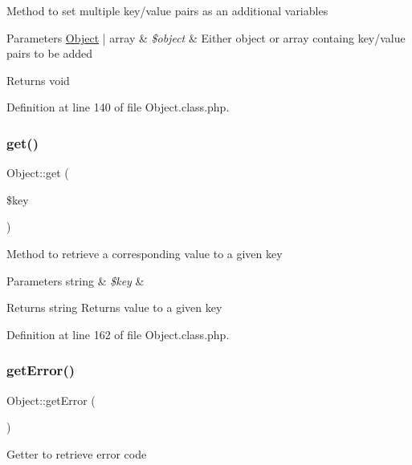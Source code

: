 Method to set multiple key/value pairs as an additional variables


\begin{DoxyParams}[1]{Parameters}
\hyperlink{classObject}{Object} | array & {\em \$object} & Either object or array containg key/value pairs to be added \\
\hline
\end{DoxyParams}
\begin{DoxyReturn}{Returns}
void 
\end{DoxyReturn}


Definition at line 140 of file Object.\+class.\+php.

\mbox{\label{classObject_ae6dff49b7ab68822bdb4ce6940c10d3f}} 
\subsubsection{\texorpdfstring{get()}{get()}}
{\footnotesize\ttfamily Object\+::get (\begin{DoxyParamCaption}\item[{}]{\$key }\end{DoxyParamCaption})}

Method to retrieve a corresponding value to a given key


\begin{DoxyParams}[1]{Parameters}
string & {\em \$key} & \\
\hline
\end{DoxyParams}
\begin{DoxyReturn}{Returns}
string Returns value to a given key 
\end{DoxyReturn}


Definition at line 162 of file Object.\+class.\+php.

\mbox{\label{classObject_a2aaced460a018edd69bf17813d6c48df}} 
\subsubsection{\texorpdfstring{get\+Error()}{getError()}}
{\footnotesize\ttfamily Object\+::get\+Error (\begin{DoxyParamCaption}{ }\end{DoxyParamCaption})}

Getter to retrieve error code

